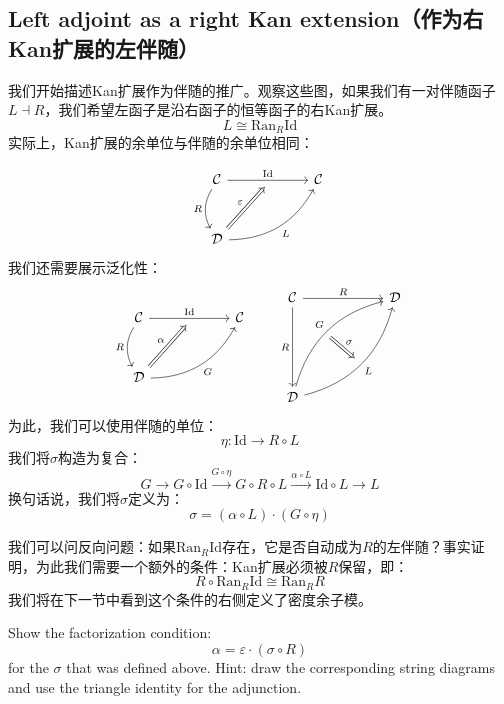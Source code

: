 \documentclass[DaoFP]{subfiles}
\begin{document}
\subsection{Left adjoint as a right Kan extension（作为右Kan扩展的左伴随）}

我们开始描述Kan扩展作为伴随的推广。观察这些图，如果我们有一对伴随函子$L \dashv R$，我们希望左函子是沿右函子的恒等函子的右Kan扩展。
\[ L \cong \text{Ran}_R \text{Id} \]
实际上，Kan扩展的余单位与伴随的余单位相同：

\[
\begin{tikzcd} [row sep=1cm, column sep=1cm]
\cat C
\arrow[rr, "\text{Id}", "" {name=ID, below} ]
\arrow[d, bend right, "R"']
&& \cat C
\\
\cat D
\arrow[urr, bend right, "L"']
\arrow[Rightarrow, "\varepsilon",  to=ID]
\end{tikzcd}
\]
我们还需要展示泛化性：
\[
\begin{tikzcd} [row sep=1cm, column sep=1cm]
\cat C
\arrow[rr, "\text{\text{Id}}", "" {name=ID, below} ]
\arrow[d, bend right, "R"']
&& \cat C
\\
\cat D
\arrow[urr, bend right, "G"']
\arrow[Rightarrow, "\alpha",  to=ID]
\end{tikzcd}
\qquad %
\begin{tikzcd}[row sep=2cm, column sep=2cm]
\cat C  \ar[d, "R"', "" {name=P}]
\ar[r, "R", ""  {name=F, below, near start, bend right}]
&
\cat D
\\
\cat D
\ar[ur, bend left, "G", "" {name=G, below}]
\ar[ur, bend right, "L"', "" {name=Ran}]
\arrow[Rightarrow, "\sigma", from=G, to=Ran]
\end{tikzcd}
\]
为此，我们可以使用伴随的单位：
\[ \eta \colon \text{Id} \to R \circ L \]
我们将$\sigma$构造为复合：
\[ G \rightarrow G \circ \text{Id} \xrightarrow{G \circ \eta} G \circ R \circ L \xrightarrow{\alpha \circ L} \text{Id} \circ L \rightarrow L\]
换句话说，我们将$\sigma$定义为：
\[ \sigma = (\alpha \circ L) \cdot (G \circ \eta) \]

我们可以问反向问题：如果$\text{Ran}_R \text{Id}$存在，它是否自动成为$R$的左伴随？事实证明，为此我们需要一个额外的条件：Kan扩展必须被$R$保留，即：
\[ R \circ \text{Ran}_R \text{Id} \cong \text{Ran}_R R \]
我们将在下一节中看到这个条件的右侧定义了密度余子模。

\begin{exercise}
Show the factorization condition:
\[ \alpha = \varepsilon \cdot (\sigma \circ R) \]
for the $\sigma$ that was defined above. Hint: draw the corresponding string diagrams and use the triangle identity for the adjunction.
\end{exercise}
\end{document}
